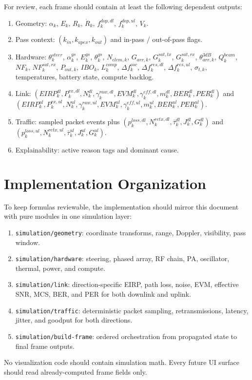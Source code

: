 \documentclass[11pt]{article}
\begin{document}
For review, each frame should contain at least the following dependent outputs:
\begin{enumerate}
  \item Geometry: $\alpha_k$, $E_k$, $R_k$, $\dot{R}_k$, $f^{dop,dl}_k$, $f^{dop,ul}_k$, $V_k$.
  \item Pass context: $(k_{in}, k_{apex}, k_{out})$ and in-pass / out-of-pass flags.
  \item Hardware: $\theta^{steer}_k$, $\alpha^{gs}_k$, $E^{gs}_k$, $\theta^{gs}_k$,
        $N_{elem,k}$, $G_{arr,k}$, $G^{sat,tx}_k$, $G^{sat,rx}_k$, $\theta^{3dB}_{arr,k}$,
        $Q^{beam}_k$, $NF_k$, $NF^{sat,rx}_k$, $P_{out,k}$, $IBO_k$, $L^{comp}_k$,
        $\Delta f^{osc}_k$, $\Delta f^{res,dl}_k$, $\Delta f^{res,ul}_k$, $\sigma_{t,k}$,
        temperatures, battery state, compute backlog.
  \item Link: $(EIRP^{dl}_k, P^{rx,dl}_k, N^{dl}_k, \gamma^{raw,dl}_k, EVM^{dl}_k, \gamma^{eff,dl}_k, m^{dl}_k, BER^{dl}_k, PER^{dl}_k)$ and $(EIRP^{ul}_k, P^{rx,ul}_k, N^{ul}_k, \gamma^{raw,ul}_k, EVM^{ul}_k, \gamma^{eff,ul}_k, m^{ul}_k, BER^{ul}_k, PER^{ul}_k)$.
  \item Traffic: sampled packet events plus $(p^{loss,dl}_k, N^{retx,dl}_k, \bar{\tau}^{dl}_k, J^{dl}_k, G^{dl}_k)$ and $(p^{loss,ul}_k, N^{retx,ul}_k, \bar{\tau}^{ul}_k, J^{ul}_k, G^{ul}_k)$.
  \item Explainability: active reason tags and dominant cause.
\end{enumerate}

\section{Implementation Organization}

To keep formulas reviewable, the implementation should mirror this document with pure
modules in one simulation layer:
\begin{enumerate}
  \item \texttt{simulation/geometry}: coordinate transforms, range, Doppler, visibility, pass window.
  \item \texttt{simulation/hardware}: steering, phased array, RF chain, PA, oscillator,
        thermal, power, and compute.
  \item \texttt{simulation/link}: direction-specific EIRP, path loss, noise, EVM,
        effective SNR, MCS, BER, and PER for both downlink and uplink.
  \item \texttt{simulation/traffic}: deterministic packet sampling, retransmissions,
        latency, jitter, and goodput for both directions.
  \item \texttt{simulation/build-frame}: ordered orchestration from propagated state to
        final frame outputs.
\end{enumerate}

No visualization code should contain simulation math. Every future UI surface should read
already-computed frame fields only.
\end{document}
